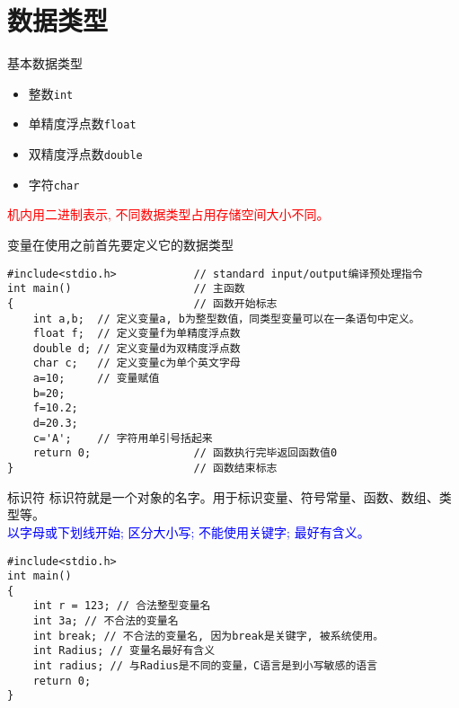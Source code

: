 
\section{数据类型}

\begin{frame}{基本数据类型}
\begin{itemize}
	\item 整数\lstinline|int|
	\item 单精度浮点数\lstinline|float|
	\item 双精度浮点数\lstinline|double|
	\item 字符\lstinline|char|
\end{itemize}
\textcolor{red}{机内用二进制表示, 不同数据类型占用存储空间大小不同。}
\end{frame}

\begin{frame}[fragile]{变量在使用之前首先要定义它的数据类型}
\begin{lstlisting}
#include<stdio.h>            // standard input/output编译预处理指令
int main()                   // 主函数
{                            // 函数开始标志
	int a,b;  // 定义变量a, b为整型数值，同类型变量可以在一条语句中定义。
	float f;  // 定义变量f为单精度浮点数
	double d; // 定义变量d为双精度浮点数
	char c;   // 定义变量c为单个英文字母
	a=10;	  // 变量赋值
	b=20;
	f=10.2;
	d=20.3;
	c='A';	  // 字符用单引号括起来
	return 0;                // 函数执行完毕返回函数值0
}                            // 函数结束标志
\end{lstlisting}
\end{frame}

\begin{frame}[fragile]{标识符}
标识符就是一个对象的名字。用于标识变量、符号常量、函数、数组、类型等。\\
\textcolor{blue}{以字母或下划线开始; 区分大小写; 不能使用关键字; 最好有含义。}
\begin{lstlisting}
#include<stdio.h>           
int main()                   
{                            
	int r = 123; // 合法整型变量名
	int 3a; // 不合法的变量名
	int break; // 不合法的变量名, 因为break是关键字, 被系统使用。
	int Radius; // 变量名最好有含义
	int radius; // 与Radius是不同的变量，C语言是到小写敏感的语言
	return 0;           
}                            
\end{lstlisting}
\end{frame}

